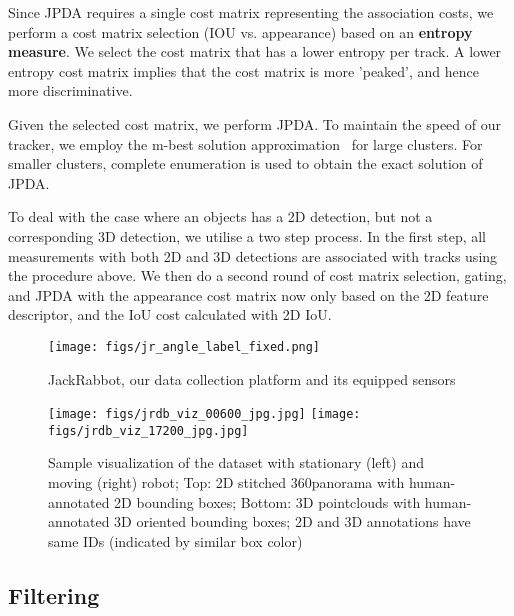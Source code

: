 \documentclass[letterpaper, 10 pt, conference]{ieeeconf}
\newcommand{\jackrabbot}{JackRabbot\xspace}
\begin{document}
Since JPDA requires a single cost matrix representing the association costs, we perform a cost matrix selection (IOU vs. appearance) based on an \textbf{entropy measure}. We select the cost matrix that has a lower entropy per track. A lower entropy cost matrix implies that the cost matrix is more 'peaked', and hence more discriminative.

Given the selected cost matrix, we perform JPDA. To maintain the speed of our tracker, we employ the m-best solution approximation~\cite{Rezatofighi:2016:CVPR} for large clusters. For smaller clusters, complete enumeration is used to obtain the exact solution of JPDA.

To deal with the case where an objects has a 2D detection, but not a corresponding 3D detection, we utilise a two step process. In the first step, all measurements with both 2D and 3D detections are associated with tracks using the procedure above. We then do a second round of cost matrix selection, gating, and JPDA with the appearance cost matrix now only based on the 2D feature descriptor, and the IoU cost calculated with 2D IoU.


\begin{figure*}[th!]
\centering
\begin{subfigure}[b]{0.27\textwidth}
\texttt{[image: figs/jr\_angle\_label\_fixed.png]}
\caption{\jackrabbot, our data collection platform and its equipped sensors}
\label{fig:JR}
\end{subfigure}
\hfill
\centering
\begin{subfigure}[b]{0.72\textwidth}
\centering
\texttt{[image: figs/jrdb\_viz\_00600\_jpg.jpg]}
\texttt{[image: figs/jrdb\_viz\_17200\_jpg.jpg]}
\caption{Sample visualization of the dataset with stationary (left) and moving (right) robot; Top: 2D stitched 360\degree panorama with human-annotated 2D bounding boxes; Bottom: 3D pointclouds with human-annotated 3D oriented bounding boxes; 2D and 3D annotations have same IDs (indicated by similar box color)}
\label{fig:visualization}
\end{subfigure}
\vspace{-10pt}
\end{figure*}

\subsection{Filtering}
\label{ss:filtering}
\end{document}
